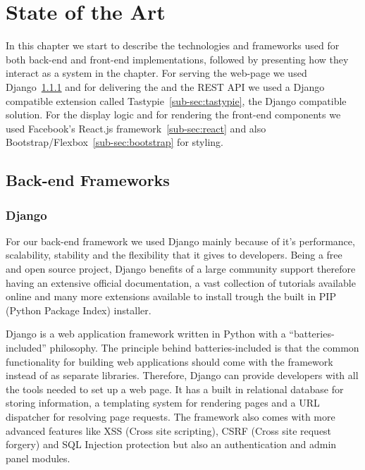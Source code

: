 \chapter{State of the Art}
\label{chapter:state}

In this chapter we start to describe the technologies and frameworks used for both back-end and front-end implementations, followed by presenting how they interact as a system in the  chapter. For serving the web-page we used Django~\ref{sub-sec:django} and for delivering the and the REST API we used a Django compatible extension called Tastypie~\ref{sub-sec:tastypie}, the Django compatible solution. For the display logic and for rendering the front-end components we used Facebook's React.js framework~\ref{sub-sec:react} and also Bootstrap/Flexbox~\ref{sub-sec:bootstrap} for styling.

\section{Back-end Frameworks}
\label{sec:backend}

\subsection{Django}
\label{sub-sec:django}

For our back-end framework we used Django mainly because of it's performance, scalability, stability and the flexibility that it gives to developers. Being a free and open source project, Django benefits of a large community support therefore having an extensive official documentation, a vast collection of tutorials available online and many more extensions available to install trough the built in PIP (Python Package Index) installer.

Django is a web application framework written in Python with a ``batteries-included'' philosophy. The principle behind batteries-included is that the common functionality for building web applications should come with the framework instead of as separate libraries. Therefore, Django can provide developers with all the tools needed to set up a web page. It has a built in relational database for storing information, a templating system for rendering pages and a URL dispatcher for resolving page requests. The framework also comes with more advanced features like XSS (Cross site scripting), CSRF (Cross site request forgery) and SQL Injection protection but also an authentication and admin panel modules.


